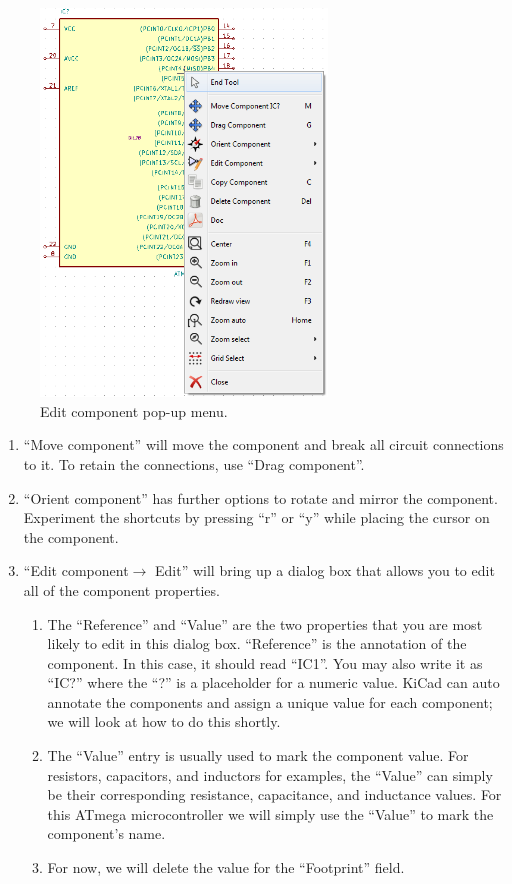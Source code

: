 \documentclass[12pt,letterpaper]{scrartcl}
\begin{document}
\begin{enumerate}
\begin{enumerate}
			\begin{figure}[h]
				\centering
				\includegraphics[width=3in]{edit-component}
				\caption{Edit component pop-up menu.}
				\label{fig:edit-component}
			\end{figure}

				\begin{enumerate}
					\item ``Move component'' will move the component and break all circuit connections to it. To retain the connections, use ``Drag component''. 
					\item ``Orient component'' has further options to rotate and mirror the component. Experiment the shortcuts by pressing ``r'' or ``y'' while placing the cursor on the component.
					\item ``Edit component$\rightarrow$ Edit'' will bring up a dialog box that allows you to edit all of the component properties. 
						\begin{enumerate}
							\item The ``Reference'' and ``Value'' are the two properties that you are most likely to edit in this dialog box. ``Reference'' is the annotation of the component. In this case, it should read ``IC1''. You may also write it as ``IC?'' where the ``?'' is a placeholder for a numeric value. KiCad can auto annotate the components and assign a unique value for each component; we will look at how to do this shortly.
							\item The ``Value'' entry is usually used to mark the component value. For resistors, capacitors, and inductors for examples, the ``Value'' can simply be their corresponding resistance, capacitance, and inductance values. For this ATmega microcontroller we will simply use the ``Value'' to mark the component’s name. 
							\item For now, we will delete the value for the ``Footprint'' field. 
						\end{enumerate}
				\end{enumerate}
		\end{enumerate}


\end{enumerate}
\end{document}
